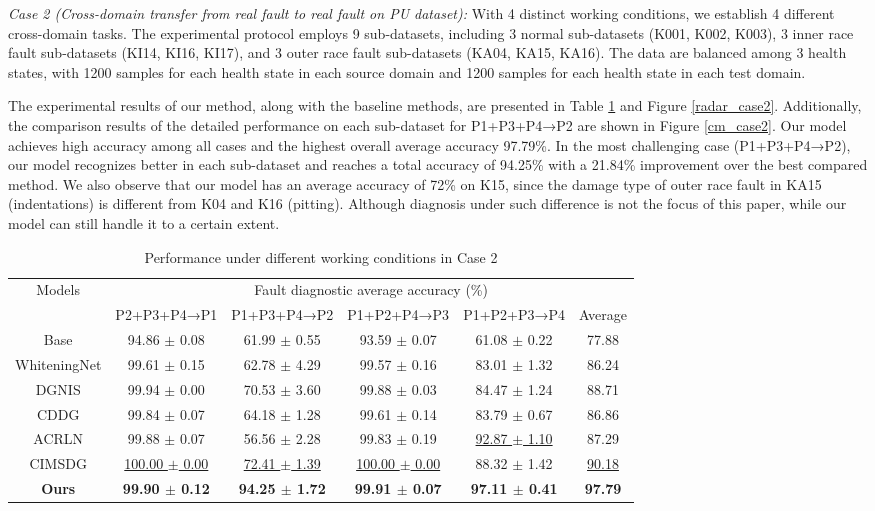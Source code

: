 \documentclass{article}
\begin{document}
	\textit{Case 2 (Cross-domain transfer from real fault to real fault on PU dataset):} With 4 distinct working conditions, we establish 4 different cross-domain tasks. The experimental protocol employs 9 sub-datasets, including 3 normal sub-datasets (K001, K002, K003), 3 inner race fault sub-datasets (KI14, KI16, KI17), and 3 outer race fault sub-datasets (KA04, KA15, KA16). The data are balanced among 3 health states, with 1200 samples for each health state in each source domain and 1200 samples for each health state in each test domain. 
	
	The experimental results of our method, along with the baseline methods, are presented in Table \ref{case2_table} and Figure \ref{radar_case2}. Additionally, the comparison results of the detailed performance on each sub-dataset for P1+P3+P4→P2 are shown in Figure \ref{cm_case2}. Our model achieves high accuracy among all cases and the highest overall average accuracy 97.79\%. In the most challenging case (P1+P3+P4→P2), our model recognizes better in each sub-dataset and reaches a total accuracy of 94.25\% with a 21.84\% improvement over the best compared method. We also observe that our model has an average accuracy of 72\% on K15, since the damage type of outer race fault in KA15 (indentations) is different from K04 and K16 (pitting). Although diagnosis under such difference is not the focus of this paper, while our model can still handle it to a certain extent.
	\begin{table}[h!]
		\vspace{-1em}
		\centering
		\smaller
		\caption{Performance under different working conditions in Case 2}\label{case2_table}
		\begin{tabular}{cccccc}
			\toprule
			\multirow{2}{*}{Models} & \multicolumn{5}{c}{Fault diagnostic average accuracy (\%)} \\
			\cmidrule[\heavyrulewidth]{2-6}
			& {P2+P3+P4→P1} & {P1+P3+P4→P2} & {P1+P2+P4→P3} & {P1+P2+P3→P4} & Average\\
			\midrule
			Base & 94.86 $\pm$ 0.08 & 61.99 $\pm$ 0.55 & 93.59 $\pm$ 0.07 & 61.08 $\pm$ 0.22 & 77.88 \\
			WhiteningNet & 99.61 $\pm$ 0.15 & 62.78 $\pm$ 4.29 & 99.57 $\pm$ 0.16 & 83.01 $\pm$ 1.32 & 86.24 \\
			DGNIS & 99.94 $\pm$ 0.00 & 70.53 $\pm$ 3.60 & 99.88 $\pm$ 0.03 & 84.47 $\pm$ 1.24 & 88.71 \\
			CDDG & 99.84 $\pm$ 0.07 & 64.18 $\pm$ 1.28 & 99.61 $\pm$ 0.14 & 83.79 $\pm$ 0.67 & 86.86 \\
			ACRLN & 99.88 $\pm$ 0.07 & 56.56 $\pm$ 2.28 & 99.83 $\pm$ 0.19 & \underline{92.87 $\pm$ 1.10} & 87.29 \\
			CIMSDG & \underline{100.00 $\pm$ 0.00} & \underline{72.41 $\pm$ 1.39} & \underline{100.00 $\pm$ 0.00} & 88.32 $\pm$ 1.42 & \underline{90.18} \\
			\midrule
			\textbf{Ours} & \textbf{99.90 $\pm$ 0.12} & \textbf{94.25 $\pm$ 1.72} & \textbf{99.91 $\pm$ 0.07} & \textbf{97.11 $\pm$ 0.41} & \textbf{ 97.79 }\\
			\bottomrule
		\end{tabular}
	\end{table}
\end{document}
